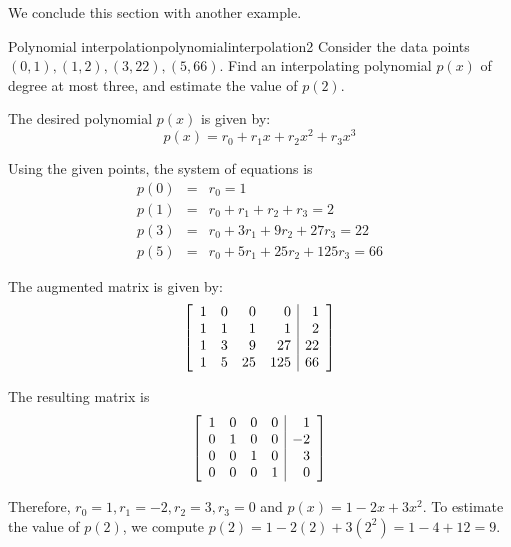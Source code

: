We conclude this section with another example. 

\begin{example}{Polynomial interpolation}{polynomialinterpolation2}
Consider the data points $(0,1), (1,2), (3,22), (5,66)$. Find an interpolating polynomial $p(x)$ of degree at most three, and estimate the value of $p(2)$. 
\end{example}

\begin{solution}
The desired polynomial $p(x)$ is given by:
\[
p(x) = r_0 + r_1 x + r_2x^2 + r_3x^3
\]

Using the given points, the system of equations is
\begin{eqnarray*}
p(0) &=& r_0 = 1 \\
p(1) &=& r_0 + r_1 + r_2 + r_3 = 2 \\
p(3) &=& r_0 + 3r_1 + 9r_2 + 27r_3 = 22 \\
p(5) &=& r_0 + 5r_1 + 25r_2 + 125r_3 = 66
\end{eqnarray*}

The augmented matrix is given by:
\[
\left[
\begin{array}{rrrr|r}
1 & 0 & 0 & 0 & 1 \\
1 & 1 & 1 & 1 & 2 \\
1 & 3 & 9 & 27 & 22 \\
1 & 5 & 25 & 125 & 66
\end{array}
\right]
\]

The resulting matrix is 
\[
\left[
\begin{array}{rrrr|r}
1 & 0 & 0 & 0 & 1 \\
0 & 1 & 0 & 0 & -2 \\
0 & 0 & 1 & 0 & 3 \\
0 & 0 & 0 & 1 & 0
\end{array}
\right]
\]

Therefore, $r_0 = 1, r_1 = -2, r_2 = 3, r_3 = 0$ and $p(x) = 1 -2x + 3x^2$. To estimate the value of $p(2)$, we compute $p(2) = 1 -2(2) + 3(2^2) = 1 - 4 + 12 = 9$.
\end{solution}